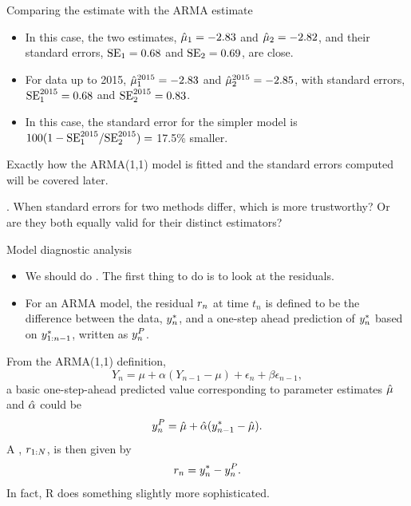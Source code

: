 \begin{frame}[fragile]{Comparing the {\iid} estimate with the ARMA estimate}



\begin{itemize}
\item In this case, the two estimates, $\hat\mu_1=-2.83$ and $\hat\mu_2=-2.82$, and their standard errors,  $\mathrm{SE}_1=0.68$ and $\mathrm{SE}_2=0.69$, are close.

\item For data up to 2015, $\hat\mu^{2015}_1=-2.83$ and $\hat\mu^{2015}_2=-2.85$, with standard errors, $\mathrm{SE}^{2015}_1=0.68$ and $\mathrm{SE}_2^{2015}=0.83$.

\item In this case, the standard error for the simpler model is  $100(1-\mathrm{SE}^{2015}_1/\mathrm{SE}^{2015}_2)=$ 17.5\% smaller.

\end{itemize}

Exactly how the ARMA(1,1) model is fitted and the standard errors computed will be covered later.

\myquestion. When standard errors for two methods differ, which is more trustworthy? Or are they both equally valid for their distinct estimators?

\answer{\vspace{2cm}}{}

\end{frame}

\begin{frame}[fragile]{Model diagnostic analysis}

\begin{itemize}

\item We should do . The first thing to do is to look at the residuals.
\item For an ARMA model, the residual $r_n$ at time $t_n$ is defined to be the difference between the data, $y_n^*$, and a one-step ahead prediction of $y_n^*$ based on $y_{1:n-1}^*$, written as $y_n^{P}$.
\end{itemize}
From the ARMA(1,1) definition, 
\begin{equation}
Y_n = \mu + \alpha(Y_{n-1}-\mu) + \epsilon_n + \beta \epsilon_{n-1},
\end{equation}
a basic one-step-ahead predicted value corresponding to parameter estimates $\hat\mu$ and $\hat\alpha$ could be
\begin{equation}
y_n^{P} = \hat{\mu} + \hat{\alpha}(y_{n-1}^*-\hat{\mu}).
\end{equation}
A , $r_{1:N}$, is then given by
\begin{equation}
r_n = y_n^* - y_n^{P}.
\end{equation}
In fact, R does something slightly more sophisticated.

\end{frame}

